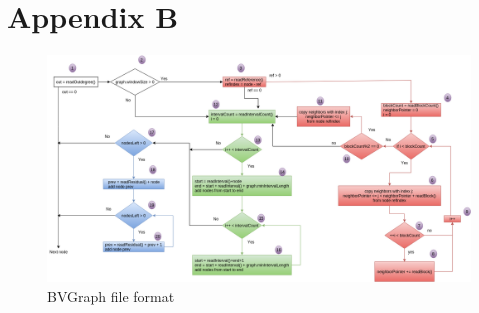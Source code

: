 \chapter{Appendix B}

\begin{figure}[ht]
    \centering
    \includegraphics[scale=.44, angle=90]{figure/BVGraph_format}
    \caption{BVGraph file format}
    \label{fig:BVGraphFormat}
\end{figure}

\newgeometry{}